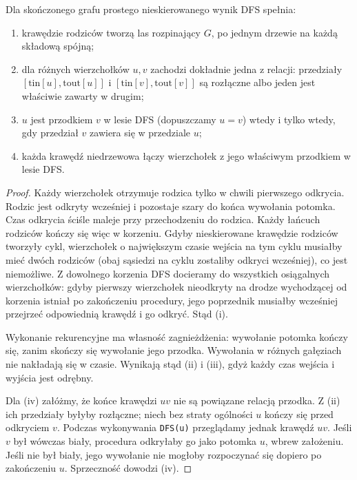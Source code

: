 \begin{twierdzenie}
\label{thm:tg-dfs-intervals}
Dla skończonego grafu prostego nieskierowanego
wynik DFS spełnia:
\begin{enumerate}[label=(\roman*)]
\item krawędzie rodziców tworzą las rozpinający $G$,
      po jednym drzewie na każdą składową spójną;
\item dla różnych wierzchołków $u,v$ zachodzi
      dokładnie jedna z relacji:
      przedziały $[\mathrm{tin}[u],\mathrm{tout}[u]]$
      i $[\mathrm{tin}[v],\mathrm{tout}[v]]$ są rozłączne
      albo jeden jest właściwie zawarty w drugim;
\item $u$ jest przodkiem $v$ w lesie DFS
      (dopuszczamy $u=v$) wtedy i tylko wtedy,
      gdy przedział $v$ zawiera się
      w przedziale $u$;
\item każda krawędź niedrzewowa łączy wierzchołek
      z jego właściwym przodkiem w lesie DFS.
\end{enumerate}
\end{twierdzenie}
\begin{proof}
Każdy wierzchołek otrzymuje rodzica tylko w chwili
pierwszego odkrycia. Rodzic jest odkryty wcześniej
i pozostaje szary do końca wywołania potomka.
Czas odkrycia ściśle maleje przy przechodzeniu do rodzica.
Każdy łańcuch rodziców kończy się więc w korzeniu.
Gdyby nieskierowane krawędzie rodziców tworzyły cykl,
wierzchołek o największym czasie wejścia na tym cyklu
musiałby mieć dwóch rodziców (obaj sąsiedzi na cyklu
zostaliby odkryci wcześniej), co jest niemożliwe.
Z dowolnego korzenia DFS docieramy do wszystkich
osiągalnych wierzchołków: gdyby pierwszy wierzchołek
nieodkryty na drodze wychodzącej od korzenia
istniał po zakończeniu procedury, jego poprzednik
musiałby wcześniej przejrzeć odpowiednią krawędź
i go odkryć. Stąd (i).

Wykonanie rekurencyjne ma własność zagnieżdżenia:
wywołanie potomka kończy się, zanim skończy się
wywołanie jego przodka. Wywołania w różnych
gałęziach nie nakładają się w czasie.
Wynikają stąd (ii) i (iii), gdyż każdy czas
wejścia i wyjścia jest odrębny.

Dla (iv) załóżmy, że końce krawędzi $uv$
nie są powiązane relacją przodka.
Z (ii) ich przedziały byłyby rozłączne;
niech bez straty ogólności $u$ kończy się
przed odkryciem $v$. Podczas wykonywania
\texttt{DFS(u)} przeglądamy jednak krawędź
$uv$. Jeśli $v$ był wówczas biały,
procedura odkryłaby go jako potomka $u$,
wbrew założeniu. Jeśli nie był biały,
jego wywołanie nie mogłoby rozpoczynać się
dopiero po zakończeniu $u$.
Sprzeczność dowodzi (iv).
\end{proof}

